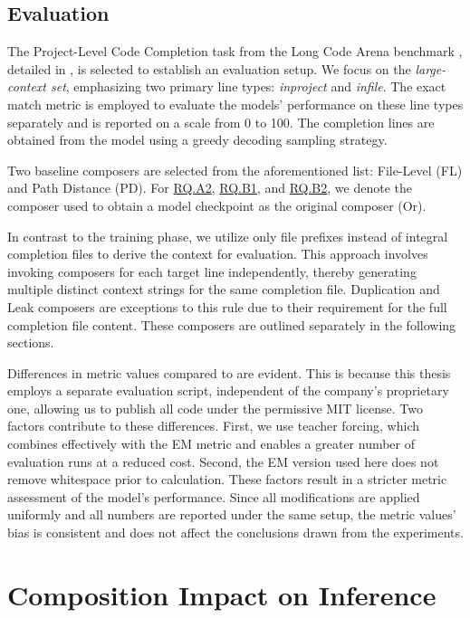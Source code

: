 \subsection{Evaluation}\label{sec:evaluation}

The Project-Level Code Completion task from the Long Code Arena benchmark \parencite{bogomolov2024}, detailed in , is selected to establish an evaluation setup. We focus on the \textit{large-context set}, emphasizing two primary line types: \textit{inproject} and \textit{infile}. The exact match metric is employed to evaluate the models' performance on these line types separately and is reported on a scale from 0 to 100. The completion lines are obtained from the model using a greedy decoding sampling strategy.

Two baseline composers are selected from the aforementioned list: File-Level (FL) and Path Distance (PD). For \hyperref[rq:rq-a2]{RQ.A2}, \hyperref[rq:rq-b1]{RQ.B1}, and \hyperref[rq:rq-b2]{RQ.B2}, we denote the composer used to obtain a model checkpoint as the original composer (Or).

In contrast to the training phase, we utilize only file prefixes instead of integral completion files to derive the context for evaluation. This approach involves invoking composers for each target line independently, thereby generating multiple distinct context strings for the same completion file. Duplication and Leak composers are exceptions to this rule due to their requirement for the full completion file content. These composers are outlined separately in the following sections.

Differences in metric values compared to \citet{sapronov2025} are evident. This is because this thesis employs a separate evaluation script, independent of the company's proprietary one, allowing us to publish all code under the permissive MIT license. Two factors contribute to these differences. First, we use teacher forcing, which combines effectively with the EM metric and enables a greater number of evaluation runs at a reduced cost. Second, the EM version used here does not remove whitespace prior to calculation. These factors result in a stricter metric assessment of the model's performance. Since all modifications are applied uniformly and all numbers are reported under the same setup, the metric values' bias is consistent and does not affect the conclusions drawn from the experiments.

\section{Composition Impact on Inference}\label{sec:composition-impact-on-inference}

